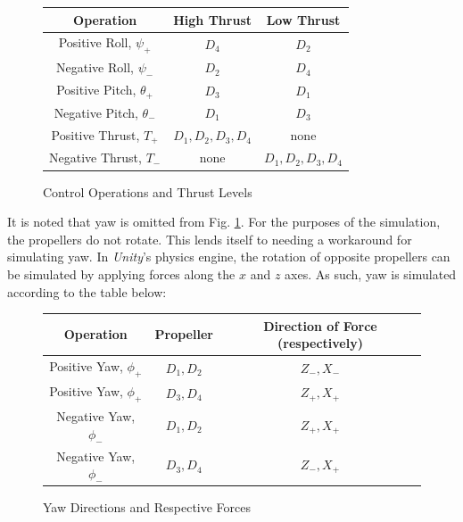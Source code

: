 \documentclass{article}
\begin{document}
\begin{figure}[H]
    \begin{center}
    \begin{tabular}{| c | c | c |} 
    \hline
    Operation & High Thrust & Low Thrust \\ 
    \hline
    Positive Roll, $\psi_+$ & $D_4$ & $D_2$ \\
    \hline
    Negative Roll, $\psi_-$ & $D_2$ & $D_4$ \\
    \hline
    Positive Pitch, $\theta_+$ & $D_3$ & $D_1$ \\
    \hline
    Negative Pitch, $\theta_-$ & $D_1$ & $D_3$ \\
    \hline
    Positive Thrust, $T_+$ & $D_1, D_2, D_3, D_4$ & none \\
    \hline
    Negative Thrust, $T_-$ & none & $D_1, D_2, D_3, D_4$ \\
    \hline
    \end{tabular}
    \end{center}
    \caption{Control Operations and Thrust Levels}
    \label{fig:control}
\end{figure}


It is noted that yaw is omitted from Fig. \ref{fig:control}. For the purposes of the simulation, the propellers do not rotate. This lends itself to needing a workaround for simulating yaw. In \emph{Unity}'s physics engine, the rotation of opposite propellers can be simulated by applying forces along the $x$ and $z$ axes. As such, yaw is simulated according to the table below:

\begin{figure}[H]
    \begin{center}
    \begin{tabular}{| c | c | c |} 
    \hline
    Operation & Propeller & Direction of Force (respectively) \\ 
    \hline
    Positive Yaw, $\phi_+$ & $D_1, D_2$ & $Z_-, X_-$ \\
    \hline
    Positive Yaw, $\phi_+$ & $D_3, D_4$ & $Z_+, X_+$ \\
    \hline
    Negative Yaw, $\phi_-$ & $D_1, D_2$ & $Z_+, X_+$ \\
    \hline
    Negative Yaw, $\phi_-$ & $D_3, D_4$ & $Z_-, X_+$ \\
    \hline
    \end{tabular}
    \end{center}
    \caption{Yaw Directions and Respective Forces}
    \label{fig:yaw-control}
\end{figure}
\end{document}
